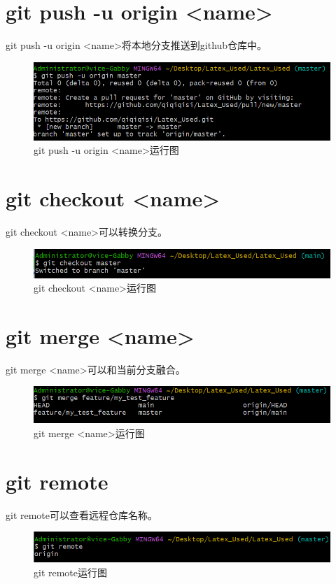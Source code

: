 \documentclass{article}
\begin{document}
\section{git push -u origin <name>}
git push -u origin <name>将本地分支推送到github仓库中。
\begin{figure}[H]
    \centering
    \includegraphics[width=1\linewidth]{git_push_branch.png}
    \caption{git push -u origin <name>运行图}
    \label{fig:pushfile}
\end{figure}

\section{git checkout <name>}
git checkout <name>可以转换分支。
\begin{figure}[H]
    \centering
    \includegraphics[width=1\linewidth]{git_checkout.png}
    \caption{git checkout <name>运行图}
    \label{fig:checkout}
\end{figure}

\section{git merge <name>}
git merge <name>可以和当前分支融合。
\begin{figure}[H]
    \centering
    \includegraphics[width=1\linewidth]{git_merge.png}
    \caption{git merge <name>运行图}
    \label{fig:merge}
\end{figure}

\section{git remote}
git remote可以查看远程仓库名称。
\begin{figure}[H]
    \centering
    \includegraphics[width=1\linewidth]{git_remote.png}
    \caption{git remote运行图}
    \label{fig:remote}
\end{figure}
\end{document}
